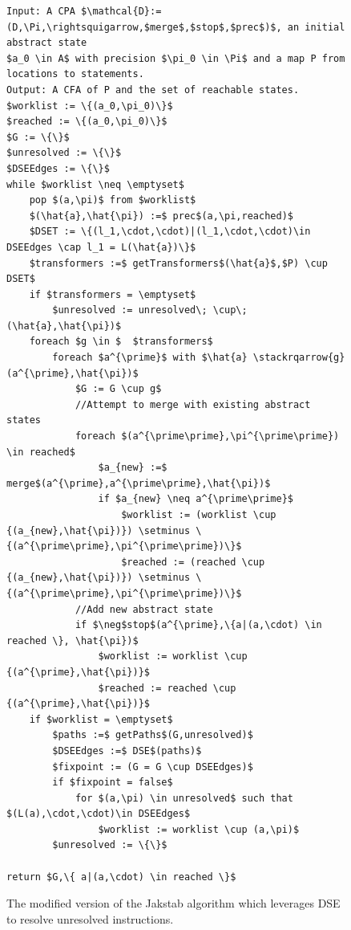 \documentclass{kththesis}
\newcommand\stackrqarrow[1]{%
    \mathrel{\stackon[2pt]{$\rightsquigarrow$}{$\scriptscriptstyle#1$}}}
\begin{document}
\begin{figure}[htb]
    \centering
\begin{algorithmFrame}
\begin{lstlisting}[style=algorithm]
Input: A CPA $\mathcal{D}:=(D,\Pi,\rightsquigarrow,$merge$,$stop$,$prec$)$, an initial abstract state
$a_0 \in A$ with precision $\pi_0 \in \Pi$ and a map P from locations to statements.
Output: A CFA of P and the set of reachable states.
$worklist := \{(a_0,\pi_0)\}$
$reached := \{(a_0,\pi_0)\}$
$G := \{\}$
$unresolved := \{\}$
$DSEEdges := \{\}$
while $worklist \neq \emptyset$ 
    pop $(a,\pi)$ from $worklist$
    $(\hat{a},\hat{\pi}) :=$ prec$(a,\pi,reached)$
    $DSET := \{(l_1,\cdot,\cdot)|(l_1,\cdot,\cdot)\in DSEEdges \cap l_1 = L(\hat{a})\}$
    $transformers :=$ getTransformers$(\hat{a}$,$P) \cup DSET$
    if $transformers = \emptyset$
        $unresolved := unresolved\; \cup\; (\hat{a},\hat{\pi})$
    foreach $g \in $  $transformers$ 
        foreach $a^{\prime}$ with $\hat{a} \stackrqarrow{g} (a^{\prime},\hat{\pi})$
            $G := G \cup g$
            //Attempt to merge with existing abstract states
            foreach $(a^{\prime\prime},\pi^{\prime\prime}) \in reached$
                $a_{new} :=$ merge$(a^{\prime},a^{\prime\prime},\hat{\pi})$
                if $a_{new} \neq a^{\prime\prime}$
                    $worklist := (worklist \cup {(a_{new},\hat{\pi})}) \setminus \{(a^{\prime\prime},\pi^{\prime\prime})\}$
                    $reached := (reached \cup {(a_{new},\hat{\pi})}) \setminus \{(a^{\prime\prime},\pi^{\prime\prime})\}$
            //Add new abstract state
            if $\neg$stop$(a^{\prime},\{a|(a,\cdot) \in reached \}, \hat{\pi})$
                $worklist := worklist \cup {(a^{\prime},\hat{\pi})}$
                $reached := reached \cup {(a^{\prime},\hat{\pi})}$
    if $worklist = \emptyset$
        $paths :=$ getPaths$(G,unresolved)$
        $DSEEdges :=$ DSE$(paths)$
        $fixpoint := (G = G \cup DSEEdges)$
        if $fixpoint = false$
            for $(a,\pi) \in unresolved$ such that $(L(a),\cdot,\cdot)\in DSEEdges$
                $worklist := worklist \cup (a,\pi)$
        $unresolved := \{\}$
            
return $G,\{ a|(a,\cdot) \in reached \}$
\end{lstlisting}
\end{algorithmFrame}
\caption[The modified version of the Jakstab algorithm which leverages DSE to resolve unresolved instructions.]{The modified version of the Jakstab algorithm which leverages DSE to resolve unresolved instructions.}
    \label{fig:ACFR1}
\end{figure}
\end{document}
